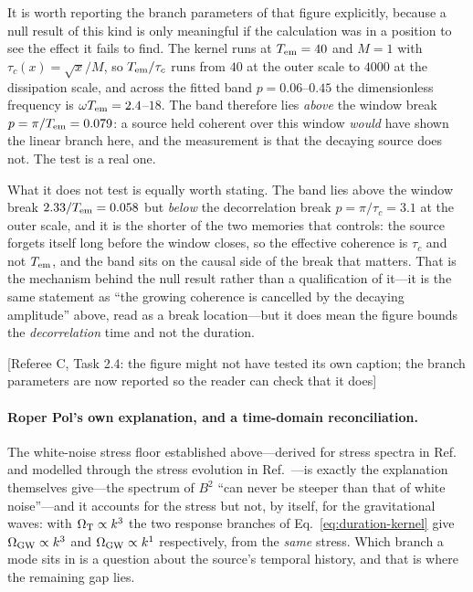 \documentclass[10pt,prd,aps,nobibnotes,superscriptaddress,preprintnumbers,notitlepage]{revtex4-1}
\newcommand{\add}[1]{{\color{red}#1}}
\newcommand{\why}[1]{{\color{red}\footnotesize\textsf{[#1]}}}
\newcommand{\add}[1]{#1}
\newcommand{\why}[1]{}
\begin{document}
\add{It is worth reporting the branch parameters of that figure explicitly, because a
null result of this kind is only meaningful if the calculation was in a position to see
the effect it fails to find. The kernel runs at $T_{\rm em}=40$ and $M=1$ with
$\tau_c(x)=\sqrt{x}/M$, so $T_{\rm em}/\tau_c$ runs from $40$ at the outer scale to
$4000$ at the dissipation scale, and across the fitted band $p=0.06$--$0.45$ the
dimensionless frequency is $\omega T_{\rm em}=2.4$--$18$. The band therefore lies
\emph{above} the window break $p=\pi/T_{\rm em}=0.079$: a source held coherent over this
window \emph{would} have shown the linear branch here, and the measurement is that the
decaying source does not. The test is a real one.

What it does not test is equally worth stating. The band lies above the window break \add{$2.33/T_{\rm em}=0.058$} but
\emph{below} the decorrelation break $p=\pi/\tau_c=3.1$ at the outer scale, and it is the
shorter of the two memories that controls: the source forgets itself long before the
window closes, so the effective coherence is $\tau_c$ and not $T_{\rm em}$, and the band
sits on the causal side of the break that matters. That is the mechanism behind the null
result rather than a qualification of it---it is the same statement as ``the growing
coherence is cancelled by the decaying amplitude'' above, read as a break location---but
it does mean the figure bounds the \emph{decorrelation} time and not the duration.}
\why{Referee C, Task 2.4: the figure might not have tested its own caption; the branch
parameters are now reported so the reader can check that it does}

\paragraph{Roper Pol's own explanation, and a time-domain reconciliation.}
The white-noise stress floor established above---derived for stress spectra in
Ref.~\cite{Brandenburg:2019uzj} and modelled through the stress evolution in
Ref.~\cite{Sharma:2022ysf}---is exactly the explanation
\cite{RoperPol:2019wvy} themselves give---the spectrum of $B^2$ ``can never be steeper than that
of white noise''---and it accounts for the stress but not, by itself, for the gravitational
waves: with $\Omega_{\rm T}\propto k^3$ the two response branches of
Eq.~\eqref{eq:duration-kernel} give $\Omega_{\rm GW}\propto k^3$ and $\Omega_{\rm GW}\propto
k^1$ respectively, from the \emph{same} stress. Which branch a mode sits in is a question
about the source's temporal history, and that is where the remaining gap lies.
\end{document}
